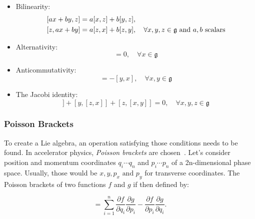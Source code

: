 \begin{itemize}
    \item Bilinearity:
    \begin{equation}
        \begin{aligned}
        \relax[ax+by, z] &= a[x,z] + b[y,z], \\
        [z, ax+by] &= a[z,x] + b[z,y], \quad \forall x,y,z \in \mathfrak{g}~\text{and}~a,b~\text{scalars}
        \label{eq:coordinates:bilinearity}
        \end{aligned}
    \end{equation}

    \item Alternativity:
    \begin{equation}
        [x,x] = 0, \quad \forall x \in \mathfrak{g}
    \end{equation}

    \item Anticommutativity:
    \begin{equation}
        [x,y] = -[y,x], \quad \forall x,y \in \mathfrak{g}
    \end{equation}

    \item The Jacobi identity:
    \begin{equation}
        [x,[y,z]] + [y, [z,x]] + [z, [x,y]] = 0, \quad \forall x,y,z \in \mathfrak{g}
        \label{eq:coordinates:jacobi_identity}
    \end{equation}
\end{itemize}




\subsubsection{Poisson Brackets}

To create a Lie algebra, an operation satisfying those conditions needs to be found. In accelerator
physics, \textit{Poisson brackets} are chosen~\cite{dragt_overview_2013,roy_analysis_1992}. Let's
consider position and momentum coordinates $q_i \cdots q_n$ and $p_i \cdots p_n$  of a
2n-dimensional phase space. Usually, those would be $x, y, p_x \text{ and } p_y$ for transverse
coordinates. The Poisson brackets of two functions $f$ and $g$ if then defined by:

\begin{equation}
    [f,g] = \sum^n_{i=1} \frac{\partial f}{\partial q_i} \frac{\partial g}{\partial p_i}
                       - \frac{\partial f}{\partial p_i} \frac{\partial g}{\partial q_i}.
\end{equation}



